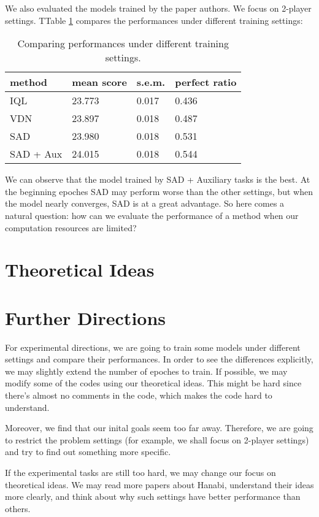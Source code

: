 \documentclass[12pt]{article}
\begin{document}
We also evaluated the models trained by the paper authors. We focus on 2-player settings. TTable \ref{Tab2} compares the performances under different training settings:
\begin{table}[H]
\begin{centering}
\begin{tabular}{|l|l|l|l|}
\hline
method & mean score & s.e.m. & perfect ratio \\ \hline
IQL & 23.773 & 0.017 & 0.436 \\ \hline
VDN & 23.897 & 0.018 & 0.487 \\ \hline
SAD & 23.980 & 0.018 & 0.531 \\ \hline
SAD + Aux & 24.015 & 0.018 & 0.544 \\ \hline
\end{tabular}
\caption{Comparing performances under different training settings.}
\label{Tab2}
\end{centering}
\end{table}

We can observe that the model trained by SAD + Auxiliary tasks is the best. At the beginning epoches SAD may perform worse than the other settings, but when the model nearly converges, SAD is at a great advantage. So here comes a natural question: how can we evaluate the performance of a method when our computation resources are limited?

\section{Theoretical Ideas}

\section{Further Directions}
For experimental directions, we are going to train some models under different settings and compare their performances. In order to see the differences explicitly, we may slightly extend the number of epoches to train. If possible, we may modify some of the codes using our theoretical ideas. This might be hard since there's almost no comments in the code, which makes the code hard to understand.

Moreover, we find that our inital goals seem too far away. Therefore, we are going to restrict the problem settings (for example, we shall focus on 2-player settings) and try to find out something more specific.

If the experimental tasks are still too hard, we may change our focus on theoretical ideas. We may read more papers about Hanabi, understand their ideas more clearly, and think about why such settings have better performance than others.

\normalem
%
%
\end{document}
